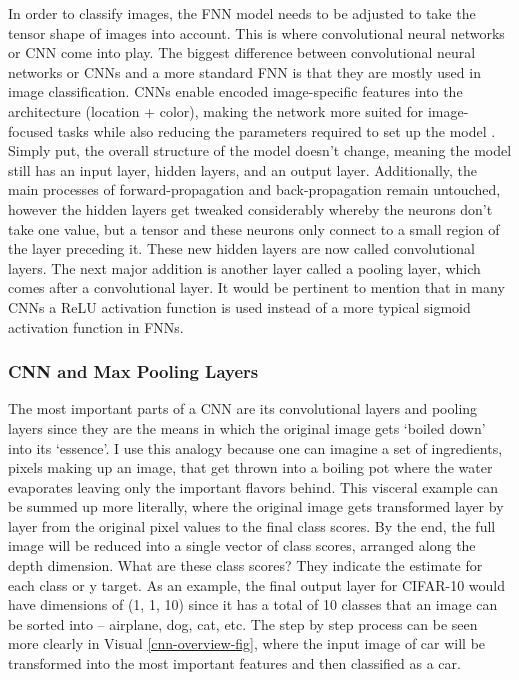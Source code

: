 \documentclass[12pt]{article}
\begin{document}
            
                In order to classify images, the FNN model needs to be adjusted to take the tensor shape of images into account. 
                This is where convolutional neural networks or CNN come into play. 
                The biggest difference between convolutional neural networks 
                or CNNs and a more standard FNN is that they are mostly used in image classification. 
                CNNs enable encoded image-specific features into the architecture (location + color), 
                making the network more suited for image-focused tasks 
                while also reducing the parameters required to set up the model \cite{oshea2015}. 
                Simply put, the overall structure of the model doesn’t change, 
                meaning the model still has an input layer, hidden layers, and an output layer. 
                Additionally, the main processes of forward-propagation and back-propagation remain untouched, 
                however the hidden layers get tweaked considerably whereby the neurons don’t take one value, 
                but a tensor and these neurons only connect to a small region of the layer preceding it. 
                These new hidden layers are now called convolutional layers. 
                The next major addition is another layer called a pooling layer, which comes after a convolutional layer. 
                It would be pertinent to mention that in many CNNs a ReLU activation function is used 
                instead of a more typical sigmoid activation function in FNNs.
            
            \subsubsection{CNN and Max Pooling Layers}


                The most important parts of a CNN are its convolutional layers and pooling layers 
                since they are the means in which the original image gets ‘boiled down’ into its ‘essence’.
                I use this analogy because one can imagine a set of ingredients, pixels making up an image, 
                that get thrown into a boiling pot where the water evaporates leaving only the important flavors behind. 
                This visceral example can be summed up more literally, 
                where the original image gets transformed layer by layer from the original pixel values to the final class scores. 
                By the end, the full image will be reduced into a single vector of class scores, arranged along the depth dimension. 
                What are these class scores? They indicate the estimate for each class or y target. 
                As an example, the final output layer for CIFAR-10 would have dimensions of (1, 1, 10) 
                since it has a total of 10 classes that an image can be sorted into \cite{cs231n2023} -- airplane, dog, cat, etc.
                The step by step process can be seen more clearly in Visual \ref{cnn-overview-fig},
                where the input image of car will be transformed into the most important features and then classified as a car.
\end{document}
